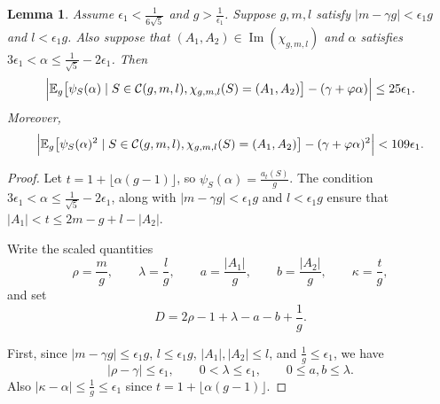 \documentclass[10pt,a4paper]{amsart}
\newtheorem{lemma}{Lemma}
\def\E{{\mathbb E}}
\def\Ima{{\operatorname{Im}}}
\newcommand{\cC}{\mathcal{C}}
\renewcommand{\phi}{\varphi}
\begin{document}
\begin{lemma}\label{Lem: depth 3 fix A1 A2}
Assume $\epsilon_1< \frac{1}{6\sqrt{5}}$ and $g>\frac{1}{\epsilon_1}$.
Suppose $g,m,l$ satisfy $|m-\gamma g|<\epsilon_1 g$ and $l<\epsilon_1 g$.  Also suppose that $(A_1,A_2)\in \Ima(\chi_{g,m,l})$ and $\alpha$ satisfies $3\epsilon_1< \alpha \leq \frac{1}{\sqrt{5}} -2\epsilon_1$.
Then
\[
\Bigl|\E_g \big[\psi_S(\alpha)\mid S\in \cC(g,m,l), \chi_{g,m,l}(S)=(A_1,A_2) \big]-(\gamma+\phi\alpha)\Bigr|
\leq 25\epsilon_1. 
\]
Moreover,
\[
\Bigl|\E_g \big[\psi_S(\alpha)^2\mid S\in \cC(g,m,l), \chi_{g,m,l}(S)=(A_1,A_2) \big]-(\gamma+\phi\alpha)^2\Bigr|
< 109\epsilon_1. 
\]
\end{lemma}

\begin{proof}
Let $t=1+\lfloor\alpha(g-1)\rfloor$, so $\psi_S(\alpha)= \frac{a_{t}(S)}{g}$. The condition $3\epsilon_1< \alpha \leq \frac{1}{\sqrt{5}} -2\epsilon_1$, along with $|m-\gamma g|<\epsilon_1 g$ and $l<\epsilon_1 g$ ensure that $|A_1|<t\leq 2m-g+l-|A_2|$.

Write the scaled quantities
\[
\rho=\frac{m}{g},\qquad \lambda=\frac{l}{g},\qquad
a=\frac{|A_1|}{g},\qquad b=\frac{|A_2|}{g},\qquad
\kappa=\frac{t}{g},
\]
and set
\[D=2\rho-1+\lambda-a-b+\frac{1}{g}.\]

First, since $|m-\gamma g|\leq \epsilon_1 g$, $l\leq \epsilon_1 g$, $|A_1|,|A_2|\leq l$, and $\frac{1}{g} \leq \epsilon_1$, we have
\[
|\rho-\gamma|\leq \epsilon_1,\qquad
0 < \lambda\leq \epsilon_1,\qquad
0\leq a,b\leq \lambda.
\]
Also $|\kappa-\alpha|\leq \frac{1}{g}\leq \epsilon_1$ since $t=1+\lfloor\alpha(g-1)\rfloor$.


\end{proof}
\end{document}

